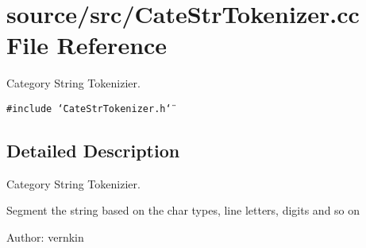 \section{source/src/CateStrTokenizer.cc File Reference}
\label{CateStrTokenizer_8cc}
Category String Tokenizier.  


{\tt \#include \char`\"{}CateStrTokenizer.h\char`\"{}}\par


\subsection{Detailed Description}
Category String Tokenizier. 

Segment the string based on the char types, line letters, digits and so on

\begin{Desc}
\item[Author:]vernkin \end{Desc}
